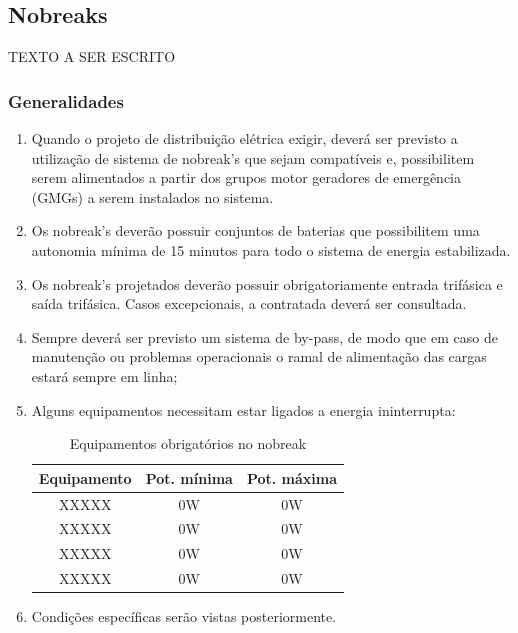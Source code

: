 \subsection{Nobreaks} \label{section: nobreak}
TEXTO A SER ESCRITO

\subsubsection{Generalidades}
\begin{enumerate}
	\item Quando o projeto de distribuição elétrica exigir, deverá ser previsto a utilização de sistema de nobreak’s que sejam compatíveis e, possibilitem serem alimentados a partir dos grupos motor geradores de emergência (GMGs) a serem instalados no sistema. 
	
	\item Os nobreak’s deverão possuir conjuntos de baterias que possibilitem uma autonomia mínima de 15 minutos para todo o sistema de energia estabilizada.
	
	\item Os nobreak’s projetados deverão possuir obrigatoriamente entrada trifásica e saída trifásica. Casos excepcionais, a contratada deverá ser consultada.
	
	\item Sempre deverá ser previsto um sistema de by-pass, de modo que em caso de manutenção ou problemas operacionais o ramal de alimentação das cargas estará sempre em linha;
	
	\item Alguns equipamentos necessitam estar ligados a energia ininterrupta:
	\begin{table}[ht]
		\centering
		\caption{Equipamentos obrigatórios no nobreak}
		\begin{tabular}[t]{ccc}
			\toprule
			\color{Tue-red}\textbf{Equipamento}&\color{Tue-red}\textbf{Pot. mínima}&\color{Tue-red}\textbf{Pot. máxima}\\
			\midrule
			XXXXX&0W&0W\\
			XXXXX&0W&0W\\
			XXXXX&0W&0W\\
			XXXXX&0W&0W\\
			\bottomrule
		\end{tabular}
		\label{table: equipamentosxnobreak}
	\end{table}
	
	\item Condições específicas serão vistas posteriormente.
	

\end{enumerate}
